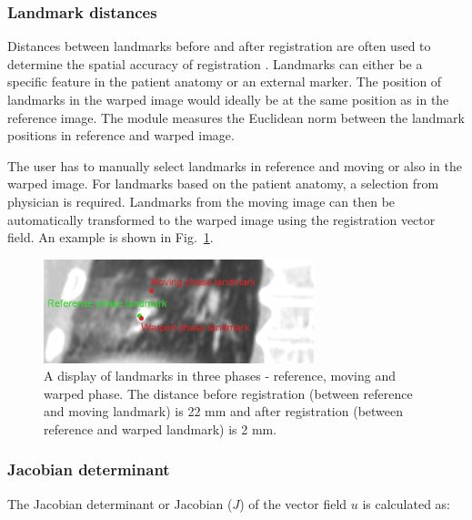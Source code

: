 \newpage
\subsubsection{Landmark distances}

Distances between landmarks before and after registration are often used to determine the spatial accuracy of registration \cite{Castillo2009}. 
Landmarks can either be a specific feature in the patient anatomy or an external marker. The position of landmarks in the warped image would ideally 
be at the same position as in the reference image. The module measures the Euclidean norm between the landmark positions in reference and warped image.

The user has to manually select landmarks in reference and moving or also in the warped image. For landmarks based on the patient anatomy, a selection from physician is required. 
Landmarks from the moving image can then be automatically transformed to the warped image using the registration vector field. An example is shown in Fig.~\ref{landmark}.

\vspace{10mm}

\begin{figure}[H]
\begin{center}
\includegraphics[width=0.7\textwidth]{./Vmm/Images/landmark.png}
\caption{A display of landmarks in three phases - reference, moving and warped phase. The distance before registration (between reference and moving landmark) is 22 mm and after registration
(between reference and warped landmark) is 2 mm.}
\label{landmark}
\end{center}
\end{figure}

\newpage

\subsubsection{Jacobian determinant}
\label{Jacobian}

The Jacobian determinant or Jacobian ($J$) of the vector field $u$ is calculated as:



